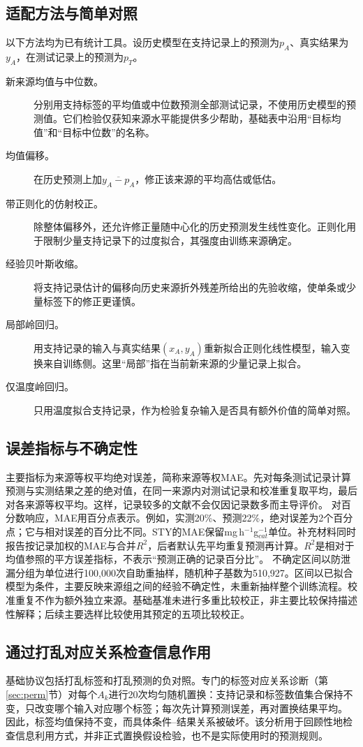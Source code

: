 \documentclass[11pt,a4paper]{article}
\begin{document}
\subsection{适配方法与简单对照}
以下方法均为已有统计工具。设历史模型在支持记录上的预测为$p_A$、真实结果为$y_A$，在测试记录上的预测为$p_T$。
\begin{description}
\item[新来源均值与中位数。]分别用支持标签的平均值或中位数预测全部测试记录，不使用历史模型的预测值。它们检验仅获知来源水平能提供多少帮助，基础表中沿用“目标均值”和“目标中位数”的名称。
\item[均值偏移。]在历史预测上加$\overline{y_A-p_A}$，修正该来源的平均高估或低估。
\item[带正则化的仿射校正。]除整体偏移外，还允许修正量随中心化的历史预测发生线性变化。正则化用于限制少量支持记录下的过度拟合，其强度由训练来源确定。
\item[经验贝叶斯收缩。]将支持记录估计的偏移向历史来源折外残差所给出的先验收缩，使单条或少量标签下的修正更谨慎。
\item[局部岭回归。]用支持记录的输入与真实结果$(x_A,y_A)$重新拟合正则化线性模型，输入变换来自训练侧。这里“局部”指在当前新来源的少量记录上拟合。
\item[仅温度岭回归。]只用温度拟合支持记录，作为检验复杂输入是否具有额外价值的简单对照。
\end{description}

\subsection{误差指标与不确定性}
主要指标为来源等权平均绝对误差，简称来源等权MAE。先对每条测试记录计算预测与实测结果之差的绝对值，在同一来源内对测试记录和校准重复取平均，最后对各来源等权平均。这样，记录较多的文献不会仅因记录数多而主导评价。
对百分数响应，MAE用百分点表示。例如，实测20\%、预测22\%，绝对误差为2个百分点；它与相对误差的百分比不同。STY的MAE保留mg\,h$^{-1}$g$_{cat}^{-1}$单位。补充材料同时报告按记录加权的MAE与合并$R^2$，后者默认先平均重复预测再计算。$R^2$是相对于均值参照的平方误差指标，不表示“预测正确的记录百分比”。
不确定区间以防泄漏分组为单位进行100,000次自助重抽样，随机种子基数为510,927。区间以已拟合模型为条件，主要反映来源组之间的经验不确定性，未重新抽样整个训练流程。校准重复不作为额外独立来源。基础基准未进行多重比较校正，非主要比较保持描述性解释；后续主要选样比较使用其预定的五项比较校正。

\subsection{通过打乱对应关系检查信息作用}
基础协议包括打乱标签和打乱预测的负对照。专门的标签对应关系诊断（第\ref{sec:perm}节）对每个$A_k$进行20次均匀随机置换：支持记录和标签数值集合保持不变，只改变哪个输入对应哪个标签；每次先计算预测误差，再对置换结果平均。
因此，标签均值保持不变，而具体条件--结果关系被破坏。该分析用于回顾性地检查信息利用方式，并非正式置换假设检验，也不是实际使用时的预测规则。
\end{document}
